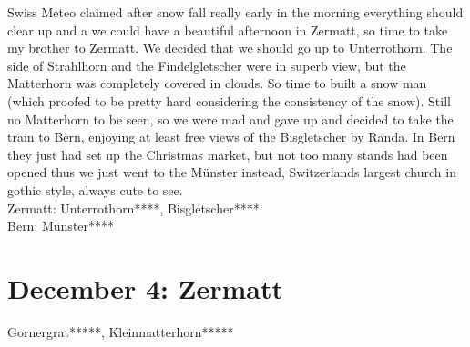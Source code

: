 Swiss Meteo claimed after snow fall really early in the morning everything should clear up and a we could have a beautiful afternoon in Zermatt, so time to take my brother to Zermatt. We decided that we should go up to Unterrothorn. The side of Strahlhorn and the Findelgletscher were in superb view, but the Matterhorn was completely covered in clouds. So time to built a snow man (which proofed to be pretty hard considering the consistency of the snow). Still no Matterhorn to be seen, so we were mad and gave up and decided to take the train to Bern, enjoying at least free views of the Bisgletscher by Randa. In Bern they just had set up the Christmas market, but not too many stands had been opened thus we just went to the M\"unster instead, Switzerlands largest church in gothic style, always cute to see.\\

Zermatt: Unterrothorn****, Bisgletscher****\\
Bern: M\"unster****

\section{December 4: Zermatt}
\label{2010ZermattII}

Gornergrat*****, Kleinmatterhorn*****
